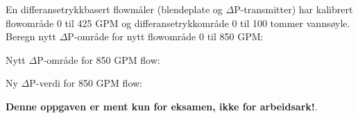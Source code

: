 

En differansetrykkbasert flowmåler (blendeplate og $\Delta$P-transmitter) har kalibrert flowområde 0 til 425 GPM og differansetrykkområde 0 til 100 tommer vannsøyle. Beregn nytt $\Delta$P-område for nytt flowområde 0 til 850 GPM:

\vskip 10pt

Nytt $\Delta$P-område for 850 GPM flow: \underbar{\hskip 50pt}







Ny $\Delta$P-verdi for 850 GPM flow: 







{\bf Denne oppgaven er ment kun for eksamen, ikke for arbeidsark!}.

